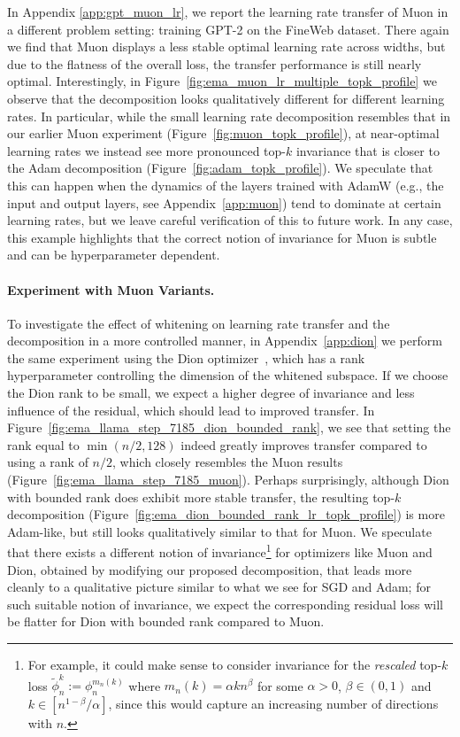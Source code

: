 \documentclass{article} %
\begin{document}
In Appendix \ref{app:gpt_muon_lr}, we report the learning rate transfer of Muon in a different problem setting: training GPT-2 on the FineWeb dataset. 
There again we find that Muon displays a less stable optimal learning rate across widths, but due to the flatness of the overall loss, the transfer performance is still nearly optimal. 
Interestingly, in Figure~\ref{fig:ema_muon_lr_multiple_topk_profile} we observe that the decomposition looks qualitatively different for different learning rates. In particular, while the small learning rate decomposition resembles that in our earlier Muon experiment (Figure~\ref{fig:muon_topk_profile}), at near-optimal learning rates we instead see more pronounced top-$k$ invariance that is closer to the Adam decomposition (Figure~\ref{fig:adam_topk_profile}). 
We speculate that this can happen when the dynamics of the layers trained with AdamW (e.g., the input and output layers, see Appendix~\ref{app:muon}) tend to dominate at certain learning rates, but we leave careful verification of this to future work. In any case, this example highlights that the correct notion of invariance for Muon is subtle and can be hyperparameter dependent. 

\paragraph{Experiment with Muon Variants.} 
To investigate the effect of whitening on learning rate transfer and the decomposition in a more controlled manner, in Appendix~\ref{app:dion} we perform the same experiment using the Dion optimizer~\cite{ahn2025dion}, which has a rank hyperparameter controlling the dimension of the whitened subspace. If we choose the Dion rank to be small, we expect a higher degree of invariance and less influence of the residual, which should lead to improved transfer. In Figure~\ref{fig:ema_llama_step_7185_dion_bounded_rank}, we see that setting the rank equal to $\min(n/2, 128)$ indeed greatly improves transfer compared to using a rank of $n/2$, which closely resembles the Muon results (Figure~\ref{fig:ema_llama_step_7185_muon}). Perhaps surprisingly, although Dion with bounded rank does exhibit more stable transfer, the resulting top-$k$ decomposition (Figure~\ref{fig:ema_dion_bounded_rank_lr_topk_profile}) is more Adam-like, but still looks qualitatively similar to that for Muon. We speculate that there exists a different notion of invariance\footnote{For example, it could make sense to consider invariance for the \emph{rescaled} top-$k$ loss $\tilde{\phi}_n^k := \phi_{n}^{m_n(k)}$ where $m_n(k) = \alpha k n^{\beta}$ for some $\alpha > 0$, $\beta \in (0, 1)$ and $k \in [n^{1-\beta} / \alpha]$, since this would capture an increasing number of directions with $n$. \vspace{-3.5mm} } for optimizers like Muon and Dion, obtained by modifying our proposed decomposition, that leads more cleanly to a qualitative picture similar to what we see for SGD and Adam; for such suitable notion of invariance, we expect the corresponding residual loss will be flatter for Dion with bounded rank compared to Muon. 
\end{document}
